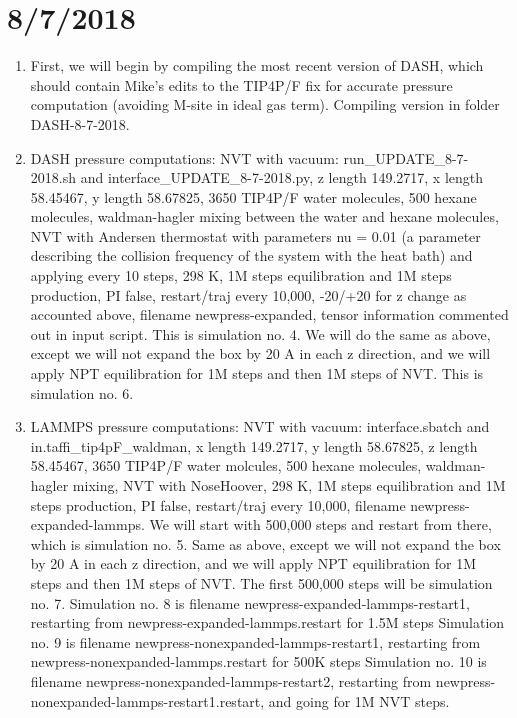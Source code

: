 \documentclass[12pt,reqno]{amsart}
\numberwithin{equation}{section}
\begin{document}
\section{8/7/2018}
\begin{enumerate}
\item First, we will begin by compiling the most recent version of DASH, which should contain Mike's edits to the TIP4P/F fix for accurate pressure computation (avoiding M-site in ideal gas term).  Compiling version in folder DASH-8-7-2018.  
\item DASH pressure computations:
\subitem NVT with vacuum: run\_UPDATE\_8-7-2018.sh and interface\_UPDATE\_8-7-2018.py, z length 149.2717, x length 58.45467, y length 58.67825, 3650 TIP4P/F water molecules, 500 hexane molecules, waldman-hagler mixing between the water and hexane molecules, NVT with Andersen thermostat with parameters nu = 0.01 (a parameter describing the collision frequency of the system with the heat bath) and applying every 10 steps, 298 K, 1M steps equilibration and 1M steps production, PI false, restart/traj every 10,000, -20/+20 for z change as accounted above, filename newpress-expanded, tensor information commented out in input script. This is simulation no. 4.   
\subitem We will do the same as above, except we will not expand the box by 20 A in each z direction, and we will apply NPT equilibration for 1M steps and then 1M steps of NVT.  This is simulation no. 6.  

\item LAMMPS pressure computations:
\subitem NVT with vacuum: interface.sbatch and in.taffi\_tip4pF\_waldman, x length 149.2717, y length 58.67825, z length 58.45467, 3650 TIP4P/F water molcules, 500 hexane molecules, waldman-hagler mixing, NVT with NoseHoover, 298 K, 1M steps equilibration and 1M steps production, PI false, restart/traj every 10,000, filename newpress-expanded-lammps.  We will start with 500,000 steps and restart from there, which is simulation no. 5. 
\subitem Same as above, except we will not expand the box by 20 A in each z direction, and we will apply NPT equilibration for 1M steps and then 1M steps of NVT.  The first 500,000 steps will be simulation no. 7.  
\subitem Simulation no. 8 is filename newpress-expanded-lammps-restart1, restarting from newpress-expanded-lammps.restart for 1.5M steps 
\subitem Simulation no. 9 is filename newpress-nonexpanded-lammps-restart1, restarting from newpress-nonexpanded-lammps.restart for 500K steps
\subitem Simulation no. 10 is filename newpress-nonexpanded-lammps-restart2, restarting from newpress-nonexpanded-lammps-restart1.restart, and going for 1M NVT steps.  
\end{enumerate}
\end{document}
